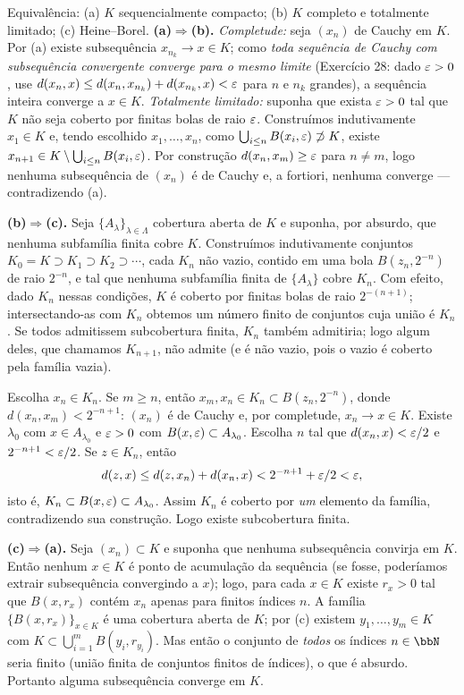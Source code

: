 \begin{exercicio}{Equivalência: (a) $K$ sequencialmente compacto; (b) $K$ completo e totalmente limitado; (c) Heine--Borel.}
\sol
\textbf{(a)$\Rightarrow$(b).} \emph{Completude:} seja $(x_n)$ de Cauchy em $K$. Por (a) existe subsequência $x_{n_k}\to x\in K$; como \emph{toda sequência de Cauchy com subsequência convergente converge para o mesmo limite} (Exercício 28: dado $\varepsilon>0$, use $d(x_n,x)\le d(x_n,x_{n_k})+d(x_{n_k},x)<\varepsilon$ para $n$ e $n_k$ grandes), a sequência inteira converge a $x\in K$. \emph{Totalmente limitado:} suponha que exista $\varepsilon>0$ tal que $K$ não seja coberto por finitas bolas de raio $\varepsilon$. Construímos indutivamente $x_1\in K$ e, tendo escolhido $x_1,\dots,x_n$, como $\bigcup_{i\le n}B(x_i,\varepsilon)\not\supset K$, existe $x_{n+1}\in K\setminus\bigcup_{i\le n}B(x_i,\varepsilon)$. Por construção $d(x_n,x_m)\ge\varepsilon$ para $n\neq m$, logo nenhuma subsequência de $(x_n)$ é de Cauchy e, a fortiori, nenhuma converge --- contradizendo (a).

\textbf{(b)$\Rightarrow$(c).} Seja $\{A_\lambda\}_{\lambda\in\Lambda}$ cobertura aberta de $K$ e suponha, por absurdo, que nenhuma subfamília finita cobre $K$. Construímos indutivamente conjuntos $K_0=K\supset K_1\supset K_2\supset\cdots$, cada $K_n$ não vazio, contido em uma bola $B(z_n,2^{-n})$ de raio $2^{-n}$, e tal que nenhuma subfamília finita de $\{A_\lambda\}$ cobre $K_n$. Com efeito, dado $K_{n}$ nessas condições, $K$ é coberto por finitas bolas de raio $2^{-(n+1)}$; intersectando-as com $K_n$ obtemos um número finito de conjuntos cuja união é $K_n$. Se todos admitissem subcobertura finita, $K_n$ também admitiria; logo algum deles, que chamamos $K_{n+1}$, não admite (e é não vazio, pois o vazio é coberto pela família vazia).

Escolha $x_n\in K_n$. Se $m\ge n$, então $x_m,x_n\in K_n\subset B(z_n,2^{-n})$, donde $d(x_n,x_m)<2^{-n+1}$: $(x_n)$ é de Cauchy e, por completude, $x_n\to x\in K$. Existe $\lambda_0$ com $x\in A_{\lambda_0}$ e $\varepsilon>0$ com $B(x,\varepsilon)\subset A_{\lambda_0}$. Escolha $n$ tal que $d(x_n,x)<\varepsilon/2$ e $2^{-n+1}<\varepsilon/2$. Se $z\in K_n$, então
\[ d(z,x)\le d(z,x_n)+d(x_n,x)<2^{-n+1}+\varepsilon/2<\varepsilon, \]
isto é, $K_n\subset B(x,\varepsilon)\subset A_{\lambda_0}$. Assim $K_n$ é coberto por \emph{um} elemento da família, contradizendo sua construção. Logo existe subcobertura finita.

\textbf{(c)$\Rightarrow$(a).} Seja $(x_n)\subset K$ e suponha que nenhuma subsequência convirja em $K$. Então nenhum $x\in K$ é ponto de acumulação da sequência (se fosse, poderíamos extrair subsequência convergindo a $x$); logo, para cada $x\in K$ existe $r_x>0$ tal que $B(x,r_x)$ contém $x_n$ apenas para finitos índices $n$. A família $\{B(x,r_x)\}_{x\in K}$ é uma cobertura aberta de $K$; por (c) existem $y_1,\dots,y_m\in K$ com $K\subset\bigcup_{i=1}^m B(y_i,r_{y_i})$. Mas então o conjunto de \emph{todos} os índices $n\in\N$ seria finito (união finita de conjuntos finitos de índices), o que é absurdo. Portanto alguma subsequência converge em $K$.


\end{exercicio}
